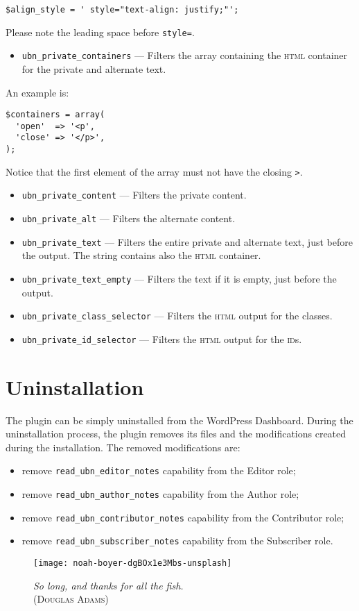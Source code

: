 \begin{lstlisting}
$align_style = ' style="text-align: justify;"';
\end{lstlisting}

Please note the leading space before \verb+style=+.

\begin{itemize}
 \item \verb+ubn_private_containers+ --- Filters the array containing the
 \textsc{html} container for the private and alternate text.
\end{itemize}

An example is:

\begin{lstlisting}
$containers = array(
  'open'  => '<p',
  'close' => '</p>',
);
\end{lstlisting}

Notice that the first element of the array must not have the closing \verb+>+.

\begin{itemize}
 \item \verb+ubn_private_content+ --- Filters the private content.
 \item \verb+ubn_private_alt+ --- Filters the alternate content.
 \item \verb+ubn_private_text+ --- Filters the entire private and alternate text,
 just before the output. The string contains also the \textsc{html} container.
 \item \verb+ubn_private_text_empty+ --- Filters the text if it is empty, just
 before the output.
 \item \verb+ubn_private_class_selector+ --- Filters the \textsc{html} output for
 the classes.
 \item \verb+ubn_private_id_selector+ --- Filters the \textsc{html} output for the
 \textsc{id}s.
\end{itemize}



\chapter{Uninstallation}

The plugin can be simply uninstalled from the WordPress Dashboard. During the
uninstallation process, the plugin removes its files and the modifications
created during the installation. The removed modifications are:

\begin{itemize}
  \item remove \texttt{read\_ubn\_editor\_notes} capability from the Editor role;
  \item remove \texttt{read\_ubn\_author\_notes} capability from the Author role;
  \item remove \texttt{read\_ubn\_contributor\_notes} capability from the Contributor role;
  \item remove \texttt{read\_ubn\_subscriber\_notes} capability from the Subscriber role.
\end{itemize}

\vfill

\begin{figure}[h]
	\centering
	\texttt{[image: noah-boyer-dgBOx1e3Mbs-unsplash]}
  \caption{\emph{So long, and thanks for all the fish.}\\(\textsc{Douglas Adams})}
	\label{fig:dolphin}
\end{figure}
